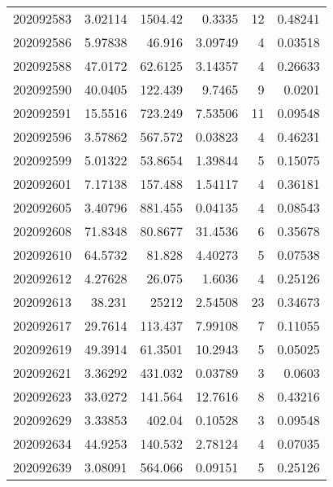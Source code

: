 \begin{tabular}{rrrrrr}
 202092583 &          3.02114 &     1504.42   &            0.3335  &          12 & 0.48241 \\
 202092586 &          5.97838 &       46.916  &            3.09749 &           4 & 0.03518 \\
 202092588 &         47.0172  &       62.6125 &            3.14357 &           4 & 0.26633 \\
 202092590 &         40.0405  &      122.439  &            9.7465  &           9 & 0.0201  \\
 202092591 &         15.5516  &      723.249  &            7.53506 &          11 & 0.09548 \\
 202092596 &          3.57862 &      567.572  &            0.03823 &           4 & 0.46231 \\
 202092599 &          5.01322 &       53.8654 &            1.39844 &           5 & 0.15075 \\
 202092601 &          7.17138 &      157.488  &            1.54117 &           4 & 0.36181 \\
 202092605 &          3.40796 &      881.455  &            0.04135 &           4 & 0.08543 \\
 202092608 &         71.8348  &       80.8677 &           31.4536  &           6 & 0.35678 \\
 202092610 &         64.5732  &       81.828  &            4.40273 &           5 & 0.07538 \\
 202092612 &          4.27628 &       26.075  &            1.6036  &           4 & 0.25126 \\
 202092613 &         38.231   &    25212      &            2.54508 &          23 & 0.34673 \\
 202092617 &         29.7614  &      113.437  &            7.99108 &           7 & 0.11055 \\
 202092619 &         49.3914  &       61.3501 &           10.2943  &           5 & 0.05025 \\
 202092621 &          3.36292 &      431.032  &            0.03789 &           3 & 0.0603  \\
 202092623 &         33.0272  &      141.564  &           12.7616  &           8 & 0.43216 \\
 202092629 &          3.33853 &      402.04   &            0.10528 &           3 & 0.09548 \\
 202092634 &         44.9253  &      140.532  &            2.78124 &           4 & 0.07035 \\
 202092639 &          3.08091 &      564.066  &            0.09151 &           5 & 0.25126 \\

\end{tabular}
